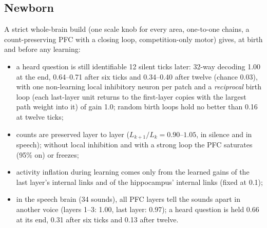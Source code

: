 \documentclass[11pt]{article}
\begin{document}
\subsection{Newborn}
A strict whole-brain build (one scale knob for every area, one-to-one chains, a count-preserving PFC with a closing loop,
competition-only motor) gives, at birth and before any learning:
\begin{itemize}
\item a heard question is still identifiable 12 silent ticks later: 32-way decoding 1.00 at the end, 0.64--0.71 after six
ticks and 0.34--0.40 after twelve (chance 0.03), with one non-learning local inhibitory neuron per patch and a
\emph{reciprocal} birth loop (each last-layer unit returns to the first-layer copies with the largest path weight into it)
of gain 1.0; random birth loops hold no better than 0.16 at twelve ticks;
\item counts are preserved layer to layer ($L_{k+1}/L_k = 0.90$--$1.05$, in silence and in speech); without local
inhibition and with a strong loop the PFC saturates (95\% on) or freezes;
\item activity inflation during learning comes only from the learned gains of the last layer's internal links and of the
hippocampus' internal links (fixed at 0.1);
\item in the speech brain (34 sounds), all PFC layers tell the sounds apart in another voice (layers 1--3: 1.00, last
layer: 0.97); a heard question is held 0.66 at its end, 0.31 after six ticks and 0.13 after twelve.
\end{itemize}
\end{document}
